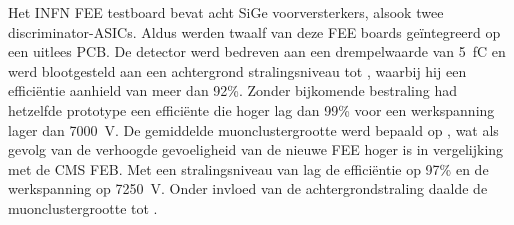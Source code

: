 	Het INFN FEE testboard bevat acht SiGe voorversterkers, alsook twee discriminator-ASICs. Aldus werden twaalf van deze FEE boards geïntegreerd op een uitlees PCB. De detector werd bedreven aan een drempelwaarde van \SI{5}{fC} en werd blootgesteld aan een achtergrond stralingsniveau tot , waarbij hij een efficiëntie aanhield van meer dan 92\%. Zonder bijkomende bestraling had hetzelfde prototype een efficiënte die hoger lag dan 99\% voor een werkspanning lager dan \SI{7000}{V}. De gemiddelde muonclustergrootte werd bepaald op , wat als gevolg van de verhoogde gevoeligheid van de nieuwe FEE hoger is in vergelijking met de CMS FEB. Met een stralingsniveau van  lag de efficiëntie op 97\% en de werkspanning op \SI{7250}{V}. Onder invloed van de achtergrondstraling daalde de muonclustergrootte tot .\vspace*{5mm}
	
